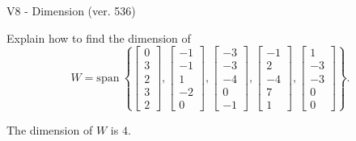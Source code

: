 \begin{exercise}
  \begin{exerciseTitle}V8 - Dimension (ver. 536)\end{exerciseTitle}
  \begin{exerciseStatement}
    Explain how to find the dimension of 
\[W=\mathrm{span}\ \left\{\left[\begin{array}{r}
0 \\
3 \\
2 \\
3 \\
2
\end{array}\right] , \left[\begin{array}{r}
-1 \\
-1 \\
1 \\
-2 \\
0
\end{array}\right] , \left[\begin{array}{r}
-3 \\
-3 \\
-4 \\
0 \\
-1
\end{array}\right] , \left[\begin{array}{r}
-1 \\
2 \\
-4 \\
7 \\
1
\end{array}\right] , \left[\begin{array}{r}
1 \\
-3 \\
-3 \\
0 \\
0
\end{array}\right]\right\}.\]



  \end{exerciseStatement}
  \begin{exerciseAnswer}
   The dimension of \(W\) is  \(4\).
  


  \end{exerciseAnswer}
\end{exercise}